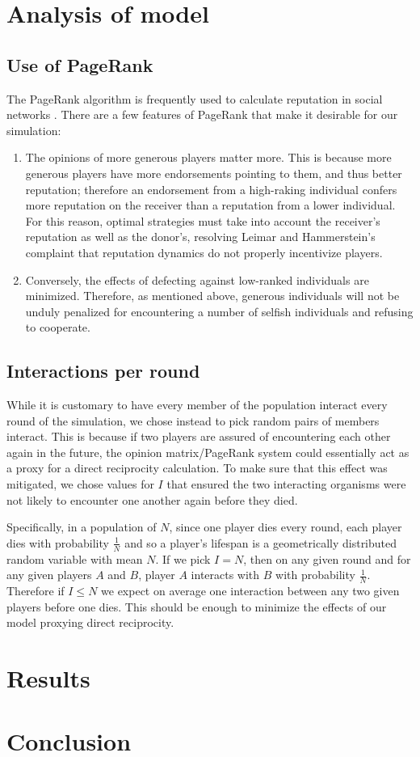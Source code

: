 \documentclass{amsart}
\begin{document}
\section{Analysis of model}
\label{sec:analysis}

\subsection{Use of PageRank}
\label{sec:whypagerank}

The PageRank algorithm is frequently used to calculate reputation in
social networks \cite{pujol_extracting_2002}. There are a few features
of PageRank that make it desirable for our simulation:
\begin{enumerate}
\item
The opinions of more generous players matter more. This is because
more generous players have more endorsements pointing to them, and
thus better reputation; therefore an endorsement from a high-raking
individual confers more reputation on the receiver than a reputation
from a lower individual. For this reason, optimal strategies must take
into account the receiver's reputation as well as the donor's,
resolving Leimar and Hammerstein's complaint
\cite{leimar_evolution_2001} that reputation dynamics do not properly
incentivize players.
\item
Conversely, the effects of defecting against low-ranked individuals
are minimized. Therefore, as mentioned above, generous individuals
will not be unduly penalized for encountering a number of selfish
individuals and refusing to cooperate.
\end{enumerate}

\subsection{Interactions per round}

While it is customary to have every member of the population interact
every round of the simulation, we chose instead to pick random pairs
of members interact. This is because if two players are assured of
encountering each other again in the future, the opinion
matrix/PageRank system could essentially act as a proxy for a direct
reciprocity calculation. To make sure that this effect was mitigated,
we chose values for $I$ that ensured the two interacting organisms
were not likely to encounter one another again before they died.

Specifically, in a population of $N$, since one player dies every
round, each player dies with probability $\frac1N$ and so a player's
lifespan is a geometrically distributed random variable with mean
$N$. If we pick $I=N$, then on any given round and for any given
players $A$ and $B$, player $A$ interacts with $B$ with probability
$\frac1N$. Therefore if $I\le N$ we expect on average one interaction
between any two given players before one dies. This should be enough
to minimize the effects of our model proxying direct reciprocity.

\section{Results}
\label{sec:results}

\section{Conclusion}
\label{sec:conclusion}

 
\end{document}
